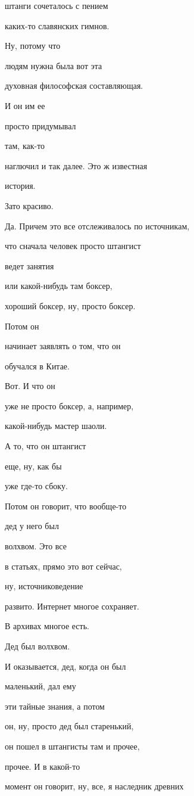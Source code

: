 штанги сочеталось с пением

каких-то славянских гимнов.

Ну, потому что

людям нужна была вот эта

духовная философская составляющая.

И он им ее

просто придумывал

там, как-то

наглючил и так далее. Это ж известная

история.

Зато красиво.

Да. Причем это все отслеживалось по источникам,

что сначала человек просто штангист

ведет занятия

или какой-нибудь там боксер,

хороший боксер, ну, просто боксер.

Потом он

начинает заявлять о том, что он

обучался в Китае.

Вот. И что он

уже не просто боксер, а, например,

какой-нибудь мастер шаоли.

А то, что он штангист

еще, ну, как бы

уже где-то сбоку.

Потом он говорит, что вообще-то

дед у него был

волхвом. Это все

в статьях, прямо это вот сейчас,

ну, источниковедение

развито. Интернет многое сохраняет.

В архивах многое есть.

Дед был волхвом.

И оказывается, дед, когда он был

маленький, дал ему

эти тайные знания, а потом

он, ну, просто дед был старенький,

он пошел в штангисты там и прочее,

прочее. И в какой-то

момент он говорит, ну, все, я наследник древних

